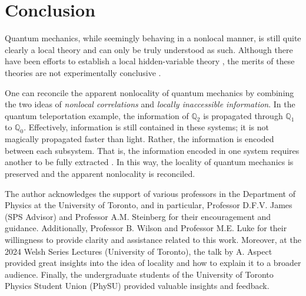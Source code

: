 \documentclass[%
 aip,
cp,  %
 amsmath,amssymb,%
 reprint,%
]{revtex4-2}
\newcommand{\Q}{\mathbb{Q}}
\begin{document}
\section{Conclusion}
    Quantum mechanics, while seemingly behaving in a nonlocal manner, is still quite clearly a local theory and can only be truly understood as such. Although there have been efforts to establish a local hidden-variable theory \cite{nagasawa_1997}, the merits of these theories are not experimentally conclusive \cite{zhao_2013}. 
    
    One can reconcile the apparent nonlocality of quantum mechanics by combining the two ideas of \textit{nonlocal correlations} and \textit{locally inaccessible information}. In the quantum teleportation example, the information of $\Q_2$ is propagated through $\Q_1$ to $\Q_0$. Effectively, information is still contained in these systems; it is not magically propagated faster than light. Rather, the information is encoded between each subsystem. That is, the information encoded in one system requires another to be fully extracted \cite{Deutsch_2000}. In this way, the locality of quantum mechanics is preserved and the apparent nonlocality is reconciled.

\begin{acknowledgments}
    The author acknowledges the support of various professors in the Department of Physics at the University of Toronto, and in particular, Professor D.F.V. James (SPS Advisor) and Professor A.M. Steinberg for their encouragement and guidance. Additionally, Professor B. Wilson and Professor M.E. Luke for their willingness to provide clarity and assistance related to this work. Moreover, at the 2024 Welsh Series Lectures (University of Toronto), the talk by A. Aspect provided great insights into the idea of locality and how to explain it to a broader audience. Finally, the undergraduate students of the University of Toronto Physics Student Union (PhySU) provided valuable insights and feedback.
\end{acknowledgments}

\nocite{*}
\end{document}
